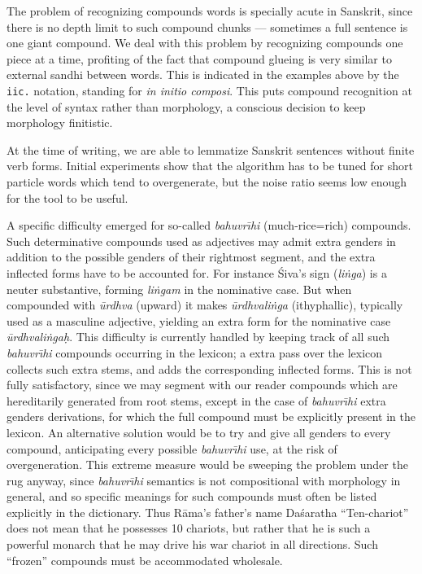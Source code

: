 The problem of recognizing compounds words is specially acute in Sanskrit, 
since there is no depth limit to such compound chunks --- sometimes a full
sentence is one giant compound. We deal with this problem by recognizing 
compounds one piece at a time, profiting of the fact that compound glueing
is very similar to external sandhi between words. This is indicated in the
examples above by the \verb"iic." notation, standing for 
{\sl in initio composi}. This puts compound recognition at the level of 
syntax rather than morphology, a conscious decision to keep morphology
finitistic. 

At the time of writing, we are able to lemmatize Sanskrit
sentences without finite verb forms. Initial experiments show that the 
algorithm has to be tuned for short particle words which tend to overgenerate, 
but the noise ratio seems low enough for the tool to be useful. 

A specific difficulty emerged for 
so-called {\sl bahuvr{\=\i}hi} (much-rice=rich)
compounds. Such determinative compounds used as
adjectives may admit extra genders in addition to 
the possible genders of their rightmost segment, 
and the extra inflected forms have to be accounted for. 
For instance \'Siva's sign ({\sl li\.nga}) is a neuter substantive,
forming {\sl li\.ngam} in the nominative case. But when
compounded with {\sl \=urdhva} (upward) it makes
{\sl \=urdhvali\.nga} (ithyphallic), typically used as a masculine adjective,
yielding an extra form for the nominative case {\sl \=urdhvali\.nga{\d h}}. 
This difficulty is currently handled by keeping track of all such 
{\sl bahuvr{\=\i}hi} compounds occurring in the lexicon; a extra pass
over the lexicon collects such extra stems, and adds the corresponding inflected
forms. This is not fully satisfactory, since we may segment with our reader
compounds which are hereditarily generated from root stems, except in the case
of {\sl bahuvr{\=\i}hi} extra genders derivations, 
for which the full compound must be 
explicitly present in the lexicon. An alternative solution would be to try
and give all genders to every compound, anticipating every possible
{\sl bahuvr{\=\i}hi} use, at the risk of overgeneration. This extreme measure
would be sweeping the problem under the rug anyway, since {\sl bahuvr{\=\i}hi} 
semantics is not compositional with morphology in general, and
so specific meanings for such compounds 
must often be listed explicitly in the dictionary. 
Thus R\=ama's father's name Da\'saratha ``Ten-chariot'' does not mean that he
possesses 10 chariots, but rather that he is such a powerful monarch that he
may drive his war chariot in all directions. 
Such ``frozen'' compounds must be accommodated wholesale.

